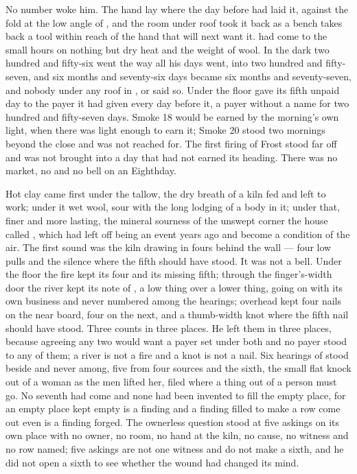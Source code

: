 
No number woke him. The hand lay where the day before had laid it, against the fold at the low angle of , and the room under  roof took it back as a bench takes back a tool within reach of the hand that will next want it.  had come to the small hours on nothing but dry heat and the weight of wool. In the dark two hundred and fifty-six went the way all his days went, into two hundred and fifty-seven, and six months and seventy-six days became six months and seventy-seven, and nobody under any roof in ,  or  said so. Under the floor  gave its fifth unpaid day to the payer it had given every day before it, a payer without a name for two hundred and fifty-seven days. Smoke 18 would be earned by the morning's own light, when there was light enough to earn it; Smoke 20 stood two mornings beyond the close and was not reached for. The first firing of Frost stood far off and was not brought into a day that had not earned its heading. There was no market, no  and no bell on an Eighthday.

Hot clay came first under the tallow, the dry breath of a kiln fed and left to work; under it wet wool, sour with the long lodging of a body in it; under that, finer and more lasting, the mineral sourness of the unswept corner the house called , which had left off being an event years ago and become a condition of the air. The first sound was the kiln drawing in fours behind the wall --- four low pulls and the silence where the fifth should have stood. It was not a bell. Under the floor the fire kept its four and its missing fifth; through the finger's-width door the river kept its note of , a low thing over a lower thing, going on with its own business and never numbered among the hearings; overhead  kept four nails on the near board, four on the next, and a thumb-width knot where the fifth nail should have stood. Three counts in three places. He left them in three places, because agreeing any two would want a payer set under both and no payer stood to any of them; a river is not a fire and a knot is not a nail. Six hearings of  stood beside and never among, five from four sources and the sixth, the small flat knock out of a woman as the men lifted her, filed where a thing out of a person must go. No seventh had come and none had been invented to fill the empty place, for an empty place kept empty is a finding and a finding filled to make a row come out even is a finding forged. The ownerless question stood at five askings on its own place with no owner, no room, no hand at the kiln, no cause, no witness and no row named; five askings are not one witness and do not make a sixth, and he did not open a sixth to see whether the wound had changed its mind.


